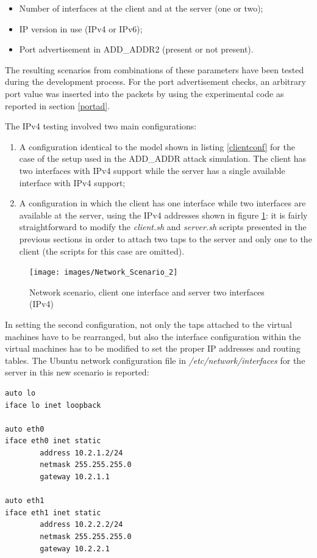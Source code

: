 \begin{itemize}
  \item Number of interfaces at the client and at the server (one or two);
  \item IP version in use (IPv4 or IPv6);
  \item Port advertisement in ADD\_ADDR2 (present or not present).
\end{itemize}

The resulting scenarios from combinations of these parameters have been tested during the development process. For the port advertisement checks, an arbitrary port value was inserted into the packets by using the experimental code as reported in section \ref{portad}.

The IPv4 testing involved two main configurations:
\begin{enumerate}
  \item A configuration identical to the model shown in listing \ref{clientconf} for the case of the setup used in the ADD\_ADDR attack simulation. The client has two interfaces with IPv4 support while the server has a single available interface with IPv4 support;
  \item  A configuration in which the client has one interface while two interfaces are available at the server, using the IPv4 addresses shown in figure \ref{fig:network2}: it is fairly straightforward to modify the \textit{client.sh} and \textit{server.sh} scripts presented in the previous sections in order to attach two taps to the server and only one to the client (the scripts for this case are omitted). 
\end{enumerate}

\begin{figure}[!htb]
\centering
\texttt{[image: images/Network\_Scenario\_2]}
\caption{Network scenario, client one interface and server two interfaces (IPv4)}
\label{fig:network2}
\end{figure} 

In setting the second configuration, not only the taps attached to the virtual machines have to be rearranged, but also the interface configuration within the virtual machines has to be modified to set the proper IP addresses and routing tables. The Ubuntu network configuration file in \textit{/etc/network/interfaces} for the server in this new scenario is reported:

\begin{verbatim}
auto lo
iface lo inet loopback

auto eth0
iface eth0 inet static
        address 10.2.1.2/24
        netmask 255.255.255.0
        gateway 10.2.1.1

auto eth1
iface eth1 inet static
        address 10.2.2.2/24
        netmask 255.255.255.0
        gateway 10.2.2.1
\end{verbatim}

